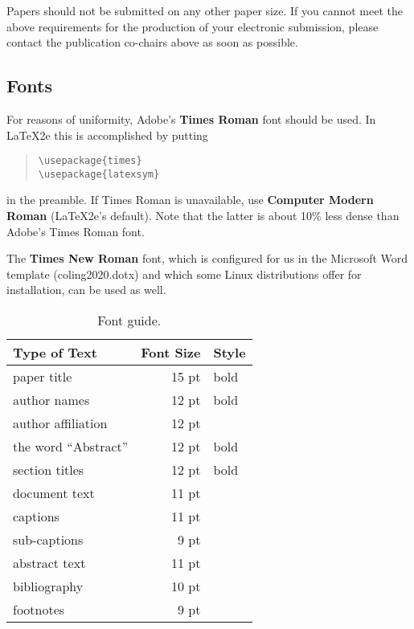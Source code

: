 \documentclass[11pt]{article}
\begin{document}
\noindent Papers should not be submitted on any other paper size.
If you cannot meet the above requirements for
the production of your electronic submission, please contact the
publication co-chairs above as soon as possible.


\subsection{Fonts}

For reasons of uniformity, Adobe's {\bf Times Roman} font should be
used. In \LaTeX2e{} this is accomplished by putting

\begin{quote}
\begin{verbatim}
\usepackage{times}
\usepackage{latexsym}
\end{verbatim}
\end{quote}
in the preamble. If Times Roman is unavailable, use {\bf Computer
  Modern Roman} (\LaTeX2e{}'s default).  Note that the latter is about
  10\% less dense than Adobe's Times Roman font.

The {\bf Times New Roman} font, which is configured for us in the
Microsoft Word template (coling2020.dotx) and which some Linux
distributions offer for installation, can be used as well.

\begin{table}[h]
\begin{center}
\begin{tabular}{|l|rl|}
\hline \bf Type of Text & \bf Font Size & \bf Style \\ \hline
paper title & 15 pt & bold \\
author names & 12 pt & bold \\
author affiliation & 12 pt & \\
the word ``Abstract'' & 12 pt & bold \\
section titles & 12 pt & bold \\
document text & 11 pt  &\\
captions & 11 pt & \\
sub-captions & 9 pt & \\
abstract text & 11 pt & \\
bibliography & 10 pt & \\
footnotes & 9 pt & \\
\hline
\end{tabular}
\end{center}
\caption{\label{font-table} Font guide. }
\end{table}
\end{document}
